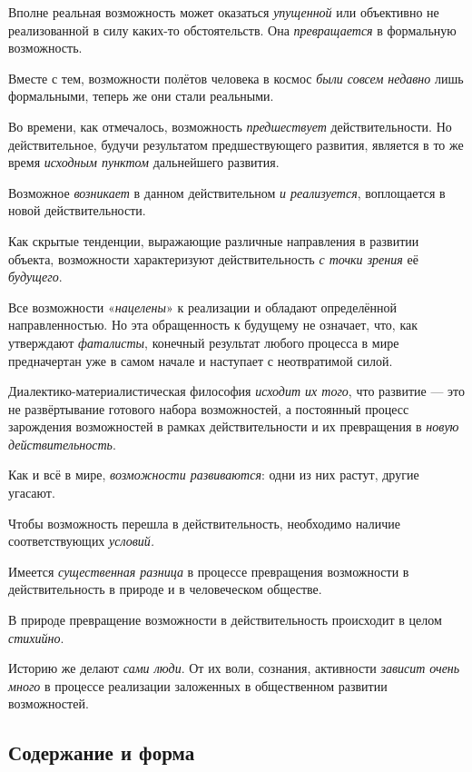\documentclass[a4paper,14pt,russian]{extreport}
\begin{document}
Вполне реальная возможность может оказаться \emph{упущенной} или объективно не реализованной в силу каких-то обстоятельств. Она \emph{превращается} в формальную возможность.

Вместе с тем, возможности полётов человека в космос \emph{были совсем недавно} лишь формальными, теперь же они стали реальными.

Во времени, как отмечалось, возможность \emph{предшествует} действительности. Но действительное, будучи результатом предшествующего развития, является в то же время \emph{исходным пунктом} дальнейшего развития.

Возможное \emph{возникает} в данном действительном \emph{и реализуется}, воплощается в новой действительности.

Как скрытые тенденции, выражающие различные направления в развитии объекта, возможности характеризуют действительность \emph{с точки зрения} её \emph{будущего}.

Все возможности «\emph{нацелены}» к реализации и обладают определённой направленностью. Но эта обращенность к будущему не означает, что, как утверждают \emph{фаталисты}, конечный результат любого процесса в мире предначертан уже в самом начале и наступает с неотвратимой силой.

Диалектико-материалистическая философия \emph{исходит их того}, что развитие --- это не развёртывание готового набора возможностей, а постоянный процесс зарождения возможностей в рамках действительности и их превращения в \emph{новую действительность}.

Как и всё в мире, \emph{возможности развиваются}: одни из них растут, другие угасают.

Чтобы возможность перешла в действительность, необходимо наличие соответствующих \emph{условий.}

Имеется \emph{существенная разница} в процессе превращения возможности в действительность в природе и в человеческом обществе.

В природе превращение возможности в действительность происходит в целом \emph{стихийно}.

Историю же делают \emph{сами люди}. От их воли, сознания, активности \emph{зависит очень много} в процессе реализации заложенных в общественном развитии возможностей.

\subsection{Содержание и форма}
\end{document}
